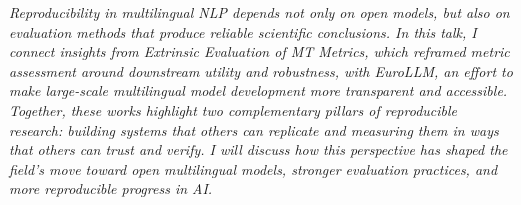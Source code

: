 \textit{Reproducibility in multilingual NLP depends not only on open models, but also on evaluation methods that produce reliable scientific conclusions. In this talk, I connect insights from Extrinsic Evaluation of MT Metrics, which reframed metric assessment around downstream utility and robustness, with EuroLLM, an effort to make large-scale multilingual model development more transparent and accessible. Together, these works highlight two complementary pillars of reproducible research: building systems that others can replicate and measuring them in ways that others can trust and verify. I will discuss how this perspective has shaped the field's move toward open multilingual models, stronger evaluation practices, and more reproducible progress in AI.}
